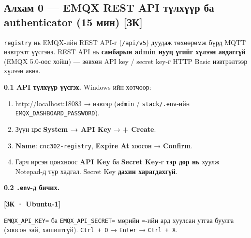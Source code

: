 \hypertarget{ux430ux43bux445ux430ux43c-0-emqx-rest-api-ux442ux4afux43bux445ux4afux4afux440-ux431ux430-authenticator-15-ux43cux438ux43d-ux437ux43a}{%
\subsection{Алхам 0 --- EMQX REST API түлхүүр ба authenticator (15 мин) {[}ЗК{]}}\label{ux430ux43bux445ux430ux43c-0-emqx-rest-api-ux442ux4afux43bux445ux4afux4afux440-ux431ux430-authenticator-15-ux43cux438ux43d-ux437ux43a}}

\texttt{registry} нь EMQX-ийн REST API-г (\texttt{/api/v5}) дуудаж төхөөрөмж бүрд MQTT нэвтрэлт үүсгэнэ. REST API нь \textbf{самбарын admin нууц үгийг хүлээн авдаггүй} (EMQX 5.0-оос хойш) --- зөвхөн API key / secret key-г HTTP Basic нэвтрэлтээр хүлээн авна.

\textbf{0.1 API түлхүүр үүсгэх.} Windows-ийн хөтчөөр:

\begin{enumerate}
\def\labelenumi{\arabic{enumi}.}
\tightlist
\item
  http://localhost:18083 → нэвтэр (\texttt{admin} / \texttt{stack/.env}-ийн \texttt{EMQX\_\allowbreak{}DASHBOARD\_\allowbreak{}PASSWORD}).
\item
  Зүүн цэс \textbf{System → API Key} → \textbf{+ Create}.
\item
  \textbf{Name}: \texttt{cnc302-registry}, \textbf{Expire At} хоосон → \textbf{Confirm}.
\item
  Гарч ирсэн цонхноос \textbf{API Key} ба \textbf{Secret Key}-г \textbf{тэр дор нь} хуулж Notepad-д түр хадгал. Secret Key \textbf{дахин харагдахгүй}.
\end{enumerate}

\textbf{0.2 \texttt{.env}-д бичих.}

\textbf{{[}ЗК · Ubuntu-1{]}}

\begin{Shaded}
\begin{Highlighting}[]
\end{Highlighting}
\end{Shaded}

\texttt{EMQX\_\allowbreak{}API\_\allowbreak{}KEY=\allowbreak{}} ба \texttt{EMQX\_\allowbreak{}API\_\allowbreak{}SECRET=\allowbreak{}} мөрийн \texttt{=}-ийн ард хуулсан утгаа буулга (хоосон зай, хашилтгүй). \texttt{Ctrl\ +\ O} → \texttt{Enter} → \texttt{Ctrl\ +\ X}.

